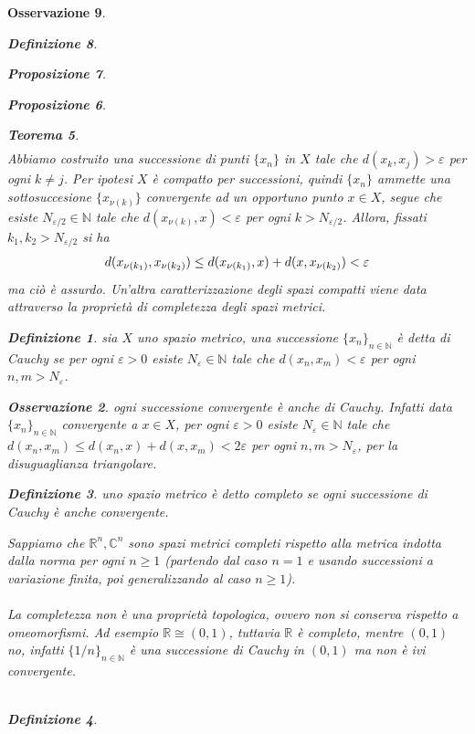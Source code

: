 \documentclass[oneside, 11pt]{amsbook}
\makeatletter
\newcommand{\0}{{(0)}}
\newcommand{\3}{{(3)}}
\theoremstyle{colonplain}
\newtheorem{thm}{Teorema}[chapter]
\newtheorem{prop}[thm]{Proposizione}
\theoremstyle{colondefinition}
\newtheorem{defn}[thm]{Definizione}
\theoremstyle{colonremark}
\newtheorem{rmk}[thm]{Osservazione}
\numberwithin{equation}{chapter}
\renewcommand{\proofname}{Dimostrazione}
\renewenvironment{proof}[1][\proofname]{\par
  \pushQED{\end{proof}}%
  \normalfont \topsep6\p@\@plus6\p@\relax
  \trivlist
  \item[\hskip\labelsep\bfseries #1:]\ignorespaces
}{%
  \popQED\endtrivlist\@endpefalse
}
\makeatother
\begin{document}
\begin{rmk}
\begin{defn}
\begin{prop}
\begin{prop}
\begin{thm}
\begin{proof}
\begin{align}
\end{align}
Abbiamo costruito una successione di punti $\{x_n\}$ in $X$ tale che $d(x_k, x_j) > \varepsilon$ per ogni $k \neq j$. Per ipotesi $X$ è compatto per successioni, quindi $\{x_n\}$ ammette una sottosuccesione $\{x_{\nu(k)}\}$ convergente ad un opportuno punto $x \in X$, segue che esiste $N_{\varepsilon/2} \in \mathbb{N}$ tale che $d(x_{\nu(k)}, x) < \varepsilon$ per ogni $k > N_{\varepsilon/2}$. Allora, fissati $k_1, k_2 > N_{\varepsilon/2}$ si ha 
\begin{align}
    d(x_{\nu(k_1)}, x_{\nu(k_2)}) \leq d(x_{\nu(k_1)}, x) + d(x, x_{\nu(k_2)}) < \varepsilon \notag
\end{align}
ma ciò è assurdo.
\end{proof}
Un'altra caratterizzazione degli spazi compatti viene data attraverso la proprietà di completezza degli spazi metrici.
\begin{defn}
sia $X$ uno spazio metrico, una successione $\{x_n\}_{n \in \mathbb{N}}$ è detta di Cauchy se per ogni $\varepsilon > 0$ esiste $N_\varepsilon \in \mathbb{N}$ tale che $d(x_n, x_m) < \varepsilon$ per ogni $n, m > N_\varepsilon$.
\end{defn}
\begin{rmk}
ogni successione convergente è anche di Cauchy. Infatti data $\{x_n\}_{n \in \mathbb{N}}$ convergente a $x \in X$, per ogni $\varepsilon > 0$ esiste $N_\varepsilon \in \mathbb{N}$ tale che $d(x_n, x_m) \leq d(x_n, x) + d(x, x_m) < 2\varepsilon$ per ogni $n, m > N_\varepsilon$, per la disuguaglianza triangolare.
\end{rmk}
\begin{defn}
uno spazio metrico è detto \textit{completo} se ogni successione di Cauchy è anche convergente.
\end{defn}
Sappiamo che $\mathbb{R}^n, \mathbb{C}^n$ sono spazi metrici completi rispetto alla metrica indotta dalla norma per ogni $n \geq 1$ (partendo dal caso $n = 1$ e usando successioni a variazione finita, poi generalizzando al caso $n \geq 1$). \\ \\
La completezza non è una proprietà topologica, ovvero non si conserva rispetto a omeomorfismi. Ad esempio $\mathbb{R} \cong (0, 1)$, tuttavia $\mathbb{R}$ è completo, mentre $(0, 1)$ no, infatti $\{1/n\}_{n \in \mathbb{N}}$ è una successione di Cauchy in $(0, 1)$ ma non è ivi convergente. \\ \\
\begin{defn} 

\end{defn}
\end{thm}
\end{prop}
\end{prop}
\end{defn}
\end{rmk}
\end{document}
